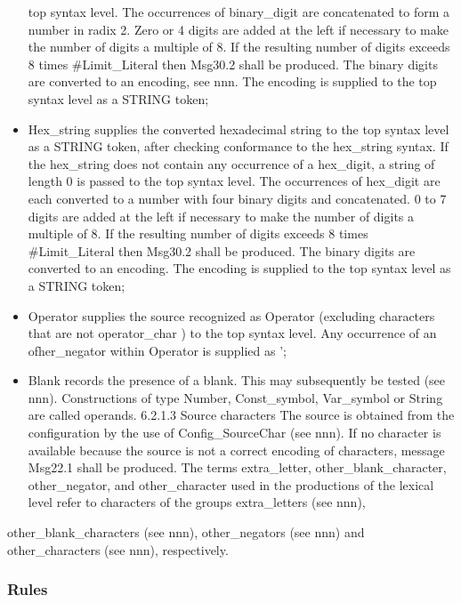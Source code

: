 \begin{itemize}
  top syntax level. The occurrences of binary\_digit are concatenated to
  form a number in radix 2. Zero or 4 digits are added at the left if
  necessary to make the number of digits a multiple of 8. If the
  resulting number of digits exceeds 8 times \#Limit\_Literal then
  Msg30.2 shall be produced. The binary digits are converted to an
  encoding, see nnn. The encoding is supplied to the top syntax level as
  a STRING token;
\item
  Hex\_string supplies the converted hexadecimal string to the top
  syntax level as a STRING token, after checking conformance to the
  hex\_string syntax. If the hex\_string does not contain any occurrence
  of a hex\_digit, a string of length 0 is passed to the top syntax
  level. The occurrences of hex\_digit are each converted to a number
  with four binary digits and concatenated. 0 to 7 digits are added at
  the left if necessary to make the number of digits a multiple of 8. If
  the resulting number of digits exceeds 8 times \#Limit\_Literal then
  Msg30.2 shall be produced. The binary digits are converted to an
  encoding. The encoding is supplied to the top syntax level as a STRING
  token;
\item
  Operator supplies the source recognized as Operator (excluding
  characters that are not operator\_char ) to the top syntax level. Any
  occurrence of an ofher\_negator within Operator is supplied as
  '\textquotesingle;
\item
  Blank records the presence of a blank. This may subsequently be tested
  (see nnn). Constructions of type Number, Const\_symbol, Var\_symbol or
  String are called operands. 6.2.1.3 Source characters The source is
  obtained from the configuration by the use of Config\_SourceChar (see
  nnn). If no character is available because the source is not a correct
  encoding of characters, message Msg22.1 shall be produced. The terms
  extra\_letter, other\_blank\_character, other\_negator, and
  other\_character used in the productions of the lexical level refer to
  characters of the groups extra\_letters (see nnn),
\end{itemize}

other\_blank\_characters (see nnn), other\_negators (see nnn) and
other\_characters (see nnn), respectively.

\subsubsection{Rules}\label{rules}

